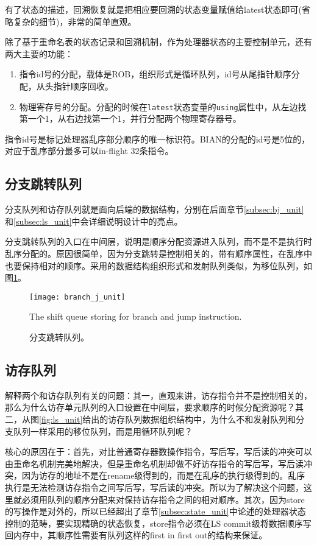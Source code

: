 有了状态的描述，回溯恢复就是把相应要回溯的状态变量赋值给latest状态即可(省略复杂的细节)，非常的简单直观。

除了基于重命名表的状态记录和回溯机制，作为处理器状态的主要控制单元，还有两大主要的功能：
\begin{enumerate}[label=(\alph*)]
	\item 指令id号的分配，载体是ROB，组织形式是循环队列，id号从尾指针顺序分配，从头指针顺序回收。
	\item 物理寄存号的分配。分配的时候在\texttt{latest}状态变量的\texttt{using}属性中，从左边找第一个1，从右边找第一个1，并行分配两个物理寄存器号。
\end{enumerate}

指令id号是标记处理器乱序部分顺序的唯一标识符。BIAN的分配的id号是5位的，对应于乱序部分最多可以in-flight 32条指令。

\subsection{分支跳转队列}

分支队列和访存队列就是面向后端的数据结构，分别在后面章节\ref{subsec:bj_unit}和\ref{subsec:ls_unit}中会详细说明设计中的亮点。

分支跳转队列的入口在中间层，说明是顺序分配资源进入队列，而不是不是执行时乱序分配的。原因很简单，因为分支跳转是控制相关的，带有顺序属性，在乱序中也要保持相对的顺序。采用的数据结构组织形式和发射队列类似，为移位队列，如图\ref{fig:bj_unit}。
\begin{figure}[!htbp]
	\centering
	\texttt{[image: branch\_j\_unit]}
	\caption{分支跳转队列。}{The shift queue storing for branch and jump instruction.}
	\label{fig:bj_unit}
\end{figure}

\subsection{访存队列}\label{subsec:ls_queue}

解释两个和访存队列有关的问题：其一，直观来讲，访存指令并不是控制相关的，那么为什么访存单元队列的入口设置在中间层，要求顺序的时候分配资源呢？其二，从图\ref{fig:ls_unit}给出的访存队列数据组织结构中，为什么不和发射队列和分支队列一样采用的移位队列，而是用循环队列呢？

核心的原因在于：首先，对比普通寄存器数操作指令，写后写，写后读的冲突可以由重命名机制完美地解决，但是重命名机制却做不好访存指令的写后写，写后读冲突，因为访存的地址不是在rename级得到的，而是在乱序的执行级得到的。乱序执行是无法检测访存指令之间写后写，写后读的冲突。所以为了解决这个问题，这里就必须用队列的顺序分配来对保持访存指令之间的相对顺序。其次，因为store的写操作是对外的，所以已经超出了章节\ref{subsec:state_unit}中论述的处理器状态控制的范畴，要实现精确的状态恢复，store指令必须在LS commit级将数据顺序写回内存中，其顺序性需要有队列这样的first in first out的结构来保证。

